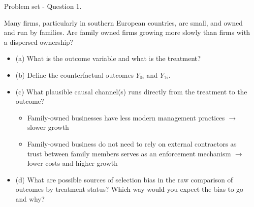 \documentclass[aspectratio=169, 11pt]{beamer}
\begin{document}
\begin{frame}{Problem set - Question 1.}

Many firms, particularly in southern European countries, are small, and owned and run by families. 
Are family owned firms growing more slowly than firms with a dispersed ownership?

\begin{itemize}
    \item (a) What is the outcome variable and what is the treatment?
    \item (b) Define the counterfactual outcomes $Y_{0i}$ and $Y_{1i}$.
    \item \alert{(c) What plausible causal channel(s) runs directly from the treatment to the outcome?}
    \begin{itemize}
        \item \alert{Family-owned businesses have less modern management practices $\rightarrow$ slower growth}
        \item \alert{Family-owned business do not need to rely on external contractors as trust between family members serves as an enforcement mechanism $\rightarrow$ lower costs and higher growth}
    \end{itemize}
    \item (d) What are possible sources of selection bias in the raw comparison of outcomes by treatment status? Which way would you expect the bias to go and why?
\end{itemize}

\end{frame}
\end{document}
